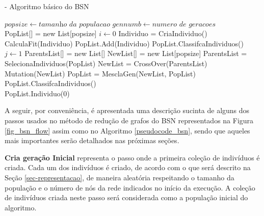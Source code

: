 \begin{algorithm} [h]
\caption{ - Algoritmo básico do BSN}
\begin{algorithmic}[1]
\State $popsize\gets \textit{tamanho da populacao}$
\State $gennumb\gets \textit{numero de geracoes}$\\
\State PopList[] = new List[popsize]
\State $i\gets 0$
\State Individuo = CriaIndividuo()
\State CalculaFit(Individuo)\label{bsn:fitness_line}
\State PopList.Add(Individuo)
\State PopList.ClassifcaIndividuos()
\EndWhile{}\\
\State $j\gets 1$
\State ParentsList[] = new List[]
\State NewList[] = new List[popsize]
\State ParentsList = SelecionaIndividuos(PopList)
\State NewList = CrossOver(ParentsList)
\State Mutation(NewList)
\State PopList = MesclaGen(NewList, PopList)
\State PopList.ClassifcaIndividuos()
\EndWhile\\
\State\Return PopList.Individuo(0)
\end{algorithmic}
\label{pseudocode_bsn}
\end{algorithm}

A seguir, por conveniência, é apresentada uma descrição sucinta de alguns dos passos usados no método de redução de grafos do BSN representados na Figura \ref{fig_bsn_flow} assim como no Algoritmo \ref{pseudocode_bsn}, sendo que aqueles mais importantes serão detalhados nas próximas seções.

\textbf{Cria geração Inicial} representa o passo onde a primeira coleção de indivíduos é criada. Cada um dos indivíduos é criado, de acordo com o que será descrito na Seção \ref{sec-representacao}, de maneira aleatória respeitando o tamanho da população e o número de nós da rede indicados no início da execução. A coleção de indivíduos criada neste passo será considerada como a população inicial do algoritmo.

